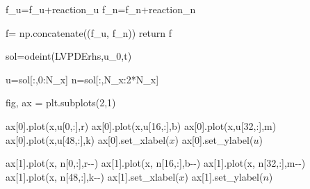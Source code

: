 \documentclass[
  letterpaper,
  DIV=11,
  numbers=noendperiod]{scrreprt}
\newenvironment{Shaded}{\begin{snugshade}}{\end{snugshade}}
\newcommand{\ControlFlowTok}[1]{\textcolor[rgb]{0.00,0.23,0.31}{#1}}
\newcommand{\DecValTok}[1]{\textcolor[rgb]{0.68,0.00,0.00}{#1}}
\newcommand{\NormalTok}[1]{\textcolor[rgb]{0.00,0.23,0.31}{#1}}
\newcommand{\OperatorTok}[1]{\textcolor[rgb]{0.37,0.37,0.37}{#1}}
\newcommand{\StringTok}[1]{\textcolor[rgb]{0.13,0.47,0.30}{#1}}
\theoremstyle{plain}
\theoremstyle{definition}
\theoremstyle{plain}
\theoremstyle{remark}
\begin{document}
\begin{Shaded}
\begin{Highlighting}[]
\NormalTok{    f\_u}\OperatorTok{=}\NormalTok{f\_u}\OperatorTok{+}\NormalTok{reaction\_u}
\NormalTok{    f\_n}\OperatorTok{=}\NormalTok{f\_n}\OperatorTok{+}\NormalTok{reaction\_n}

\NormalTok{    f}\OperatorTok{=}\NormalTok{ np.concatenate((f\_u, f\_n)) }
    \ControlFlowTok{return}\NormalTok{ f  }

\NormalTok{sol}\OperatorTok{=}\NormalTok{odeint(LVPDErhs,u\_0,t)}

\NormalTok{u}\OperatorTok{=}\NormalTok{sol[:,}\DecValTok{0}\NormalTok{:N\_x]}
\NormalTok{n}\OperatorTok{=}\NormalTok{sol[:,N\_x:}\DecValTok{2}\OperatorTok{*}\NormalTok{N\_x]}

\NormalTok{fig, ax }\OperatorTok{=}\NormalTok{ plt.subplots(}\DecValTok{2}\NormalTok{,}\DecValTok{1}\NormalTok{)}

\NormalTok{ax[}\DecValTok{0}\NormalTok{].plot(x,u[}\DecValTok{0}\NormalTok{,:],}\StringTok{\textquotesingle{}r\textquotesingle{}}\NormalTok{)}
\NormalTok{ax[}\DecValTok{0}\NormalTok{].plot(x,u[}\DecValTok{16}\NormalTok{,:],}\StringTok{\textquotesingle{}b\textquotesingle{}}\NormalTok{)}
\NormalTok{ax[}\DecValTok{0}\NormalTok{].plot(x,u[}\DecValTok{32}\NormalTok{,:],}\StringTok{\textquotesingle{}m\textquotesingle{}}\NormalTok{)}
\NormalTok{ax[}\DecValTok{0}\NormalTok{].plot(x,u[}\DecValTok{48}\NormalTok{,:],}\StringTok{\textquotesingle{}k\textquotesingle{}}\NormalTok{)}
\NormalTok{ax[}\DecValTok{0}\NormalTok{].set\_xlabel(}\StringTok{\textquotesingle{}$x$\textquotesingle{}}\NormalTok{)}
\NormalTok{ax[}\DecValTok{0}\NormalTok{].set\_ylabel(}\StringTok{\textquotesingle{}$u$\textquotesingle{}}\NormalTok{)}

\NormalTok{ax[}\DecValTok{1}\NormalTok{].plot(x, n[}\DecValTok{0}\NormalTok{,:],}\StringTok{\textquotesingle{}r{-}{-}\textquotesingle{}}\NormalTok{)}
\NormalTok{ax[}\DecValTok{1}\NormalTok{].plot(x, n[}\DecValTok{16}\NormalTok{,:],}\StringTok{\textquotesingle{}b{-}{-}\textquotesingle{}}\NormalTok{)}
\NormalTok{ax[}\DecValTok{1}\NormalTok{].plot(x, n[}\DecValTok{32}\NormalTok{,:],}\StringTok{\textquotesingle{}m{-}{-}\textquotesingle{}}\NormalTok{)}
\NormalTok{ax[}\DecValTok{1}\NormalTok{].plot(x, n[}\DecValTok{48}\NormalTok{,:],}\StringTok{\textquotesingle{}k{-}{-}\textquotesingle{}}\NormalTok{)}
\NormalTok{ax[}\DecValTok{1}\NormalTok{].set\_xlabel(}\StringTok{\textquotesingle{}$x$\textquotesingle{}}\NormalTok{)}
\NormalTok{ax[}\DecValTok{1}\NormalTok{].set\_ylabel(}\StringTok{\textquotesingle{}$n$\textquotesingle{}}\NormalTok{)}


\end{Highlighting}
\end{Shaded}
\end{document}
